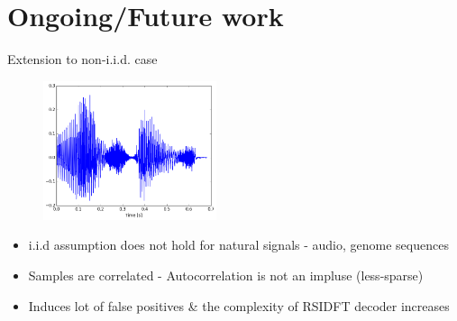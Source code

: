 \documentclass[10pt,xcolor=table]{beamer}
\begin{document}
\section{Ongoing/Future work}
\begin{frame}{Extension to non-i.i.d. case}


\begin{figure}[t]
	\begin{center}
		\includegraphics[width=2.0in]{audio_signal.png}
	\end{center}
\end{figure}

\begin{block}{}
	\begin{itemize}
		\item {\color{blue}i.i.d assumption} does not hold for {\color{blue}natural signals} - audio, genome sequences
		\item Samples are {\color{blue} correlated} - Autocorrelation is not an impluse (less-sparse)
		\item Induces lot of false positives \& the complexity of RSIDFT decoder increases 		
	\end{itemize}	
\end{block}
\end{frame}
\end{document}
